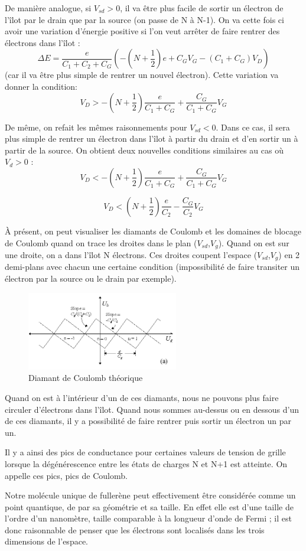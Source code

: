 De manière analogue, si $V_{sd}>0$, il va être plus facile de sortir un électron de l'îlot par le drain que par la source (on passe de N à N-1). On va cette fois ci avoir une variation d'énergie positive si l'on veut arrêter de faire rentrer des électrons dans l'îlot :
\[\Delta E = \frac{e}{C_1 + C_2 + C_G}\left(-(N + \frac{1}{2})e + C_G V_G - (C_1 + C_G) V_D\right)\]
(car il va être plus simple de rentrer un nouvel électron). Cette variation va donner la condition:
\[V_D > - (N + \frac{1}{2})\frac{e}{C_1 + C_G} + \frac{C_G}{C_1 + C_G}V_G\]

De même, on refait les mêmes raisonnements pour $V_{sd}<0$. Dans ce cas, il sera plus simple de rentrer un électron dans l'îlot à partir du drain et d'en sortir un à partir de la source. On obtient deux nouvelles conditions similaires au cas où  $V_{d}>0$ :
\[V_D < - (N + \frac{1}{2})\frac{e}{C_1 + C_G} + \frac{C_G}{C_1 + C_G}V_G\]

\[V_D < (N + \frac{1}{2})\frac{e}{C_2} - \frac{C_G}{C_2}V_G\]

À présent, on peut visualiser les diamants de Coulomb et les domaines de blocage de Coulomb quand on trace les droites dans le plan ($V_{sd}$,$V_{g}$). Quand on est sur une droite, on a dans l'îlot N électrons. Ces droites coupent l'espace ($V_{sd}$,$V_{g}$) en 2 demi-plans avec chacun une certaine condition (impossibilité de faire transiter un électron par la source ou le drain par exemple).
\begin{figure}[h]
    \begin{center}
        \includegraphics[width=250px]{Images/Diamant_Coulomb_Theorie.png}
        \caption{Diamant de Coulomb théorique}
        \label{fig:}
    \end{center}
\end{figure}

Quand on est à l'intérieur d'un de ces diamants, nous ne pouvons plus faire circuler d'électrons dans l'îlot. Quand nous sommes au-dessus ou en dessous d'un de ces diamants, il y a possibilité de faire rentrer puis sortir un électron un par un.

Il y a ainsi des pics de conductance pour certaines valeurs de tension de grille lorsque la dégénérescence entre les états de charges N et N+1 est atteinte. On appelle ces pics, pics de Coulomb.

Notre molécule unique de fullerène peut effectivement être considérée comme un point quantique, de par sa géométrie et sa taille. En effet elle est d'une taille de l'ordre d'un nanomètre, taille comparable à la longueur d'onde de Fermi ; il est donc raisonnable de penser que les électrons sont localisés dans les trois dimensions de l'espace.

